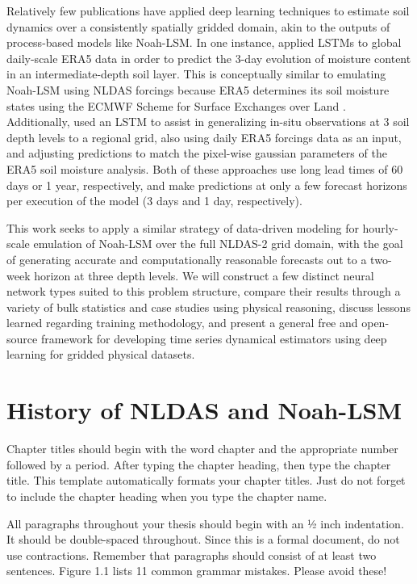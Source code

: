 Relatively few publications have applied deep learning techniques to estimate soil dynamics over a consistently spatially gridded domain, akin to the outputs of process-based models like Noah-LSM.  In one instance, \citep{filipovic_regional_2022} applied LSTMs to global daily-scale ERA5 data in order to predict the 3-day evolution of moisture content in an intermediate-depth soil layer. This is conceptually similar to emulating Noah-LSM using NLDAS forcings because ERA5 determines its soil moisture states using the ECMWF Scheme for Surface Exchanges over Land \citep{balsamo_revised_2009}. Additionally, \citep{o_global_2021} used an LSTM to assist in generalizing in-situ observations at 3 soil depth levels to a regional grid, also using daily ERA5 forcings data as an input, and adjusting predictions to match the pixel-wise gaussian parameters of the ERA5 soil moisture analysis. Both of these approaches use long lead times of 60 days or 1 year, respectively, and make predictions at only a few forecast horizons per execution of the model (3 days and 1 day, respectively).

This work seeks to apply a similar strategy of data-driven modeling for hourly-scale emulation of Noah-LSM over the full NLDAS-2 grid domain, with the goal of generating accurate and computationally reasonable forecasts out to a two-week horizon at three depth levels. We will construct a few distinct neural network types suited to this problem structure, compare their results through a variety of bulk statistics and case studies using physical reasoning, discuss lessons learned regarding training methodology, and present a general free and open-source framework for developing time series dynamical estimators using deep learning for gridded physical datasets.

\newpage

\section{History of NLDAS and Noah-LSM}

Chapter titles should begin with the word chapter and the appropriate number followed by a period. After typing the chapter heading, then type the chapter title. This template automatically formats your chapter titles. Just do not forget to include the chapter heading when you type the chapter name.

All paragraphs throughout your thesis should begin with an ½ inch indentation. It should be double-spaced throughout. Since this is a formal document, do not use contractions. Remember that paragraphs should consist of at least two sentences. Figure 1.1 lists 11 common grammar mistakes. Please avoid these!

